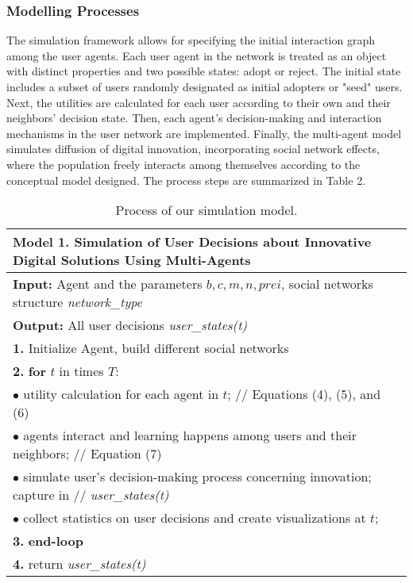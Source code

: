 \documentclass{article} %
\begin{document}
\subsubsection{Modelling Processes}
The simulation framework allows for specifying the initial interaction graph among the user agents. Each user agent in the network is treated as an object with distinct properties and two possible states: adopt or reject. The initial state includes a subset of users randomly designated as initial adopters or "seed" users. Next, the utilities are calculated for each user according to their own and their neighbors' decision state. Then, each agent's decision-making and interaction mechanisms in the user network are implemented. Finally, the multi-agent model simulates diffusion of digital innovation, incorporating social network effects, where the population freely interacts among themselves according to the conceptual model designed. The process steps are summarized in Table 2.
\begin{table}[h]
\caption{Process of our simulation model.}
\label{simulation-model}
\begin{center}
\renewcommand{\arraystretch}{1.3} %
\vspace{-0.5em} %
\begin{tabular}{p{14cm}}
    \hline
    \textbf{Model 1. Simulation of User Decisions about Innovative Digital Solutions Using Multi-Agents} \\ \hline
    \textbf{Input:} Agent and the parameters \( b, c, m, n, \textit{prei} \), social networks structure \textit{network\_type} \\
    \textbf{Output:} All user decisions \textit{user\_states(t)} \\ \hline
    \textbf{1.} Initialize Agent, build different social networks \\
    \textbf{2.} \textbf{for} \( t \) in times \( T \): \\
    \hspace{0.5cm} $\bullet$ utility calculation for each agent in \( t \); // Equations (4), (5), and (6) \\
    \hspace{0.5cm} $\bullet$ agents interact and learning happens among users and their neighbors; // Equation (7) \\
    \hspace{0.5cm} $\bullet$ simulate user’s decision-making process concerning innovation; capture in // \textit{user\_states(t)} \\
    \hspace{0.5cm} $\bullet$ collect statistics on user decisions and create visualizations at \( t \); \\
    \textbf{3.} \textbf{end-loop} \\
    \textbf{4.} return \textit{user\_states(t)} \\ \hline
\end{tabular}
\vspace{-1em} %
\end{center}
\end{table}
\end{document}
